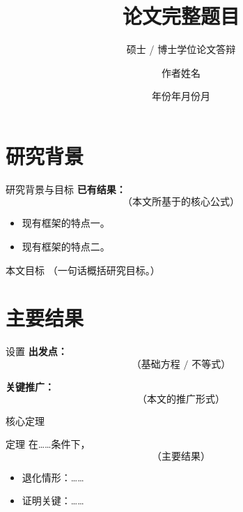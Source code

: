 \documentclass[10pt,aspectratio=169]{ctexbeamer}
\title{论文完整题目}                       %
\subtitle{硕士 / 博士学位论文答辩}        %
\author{作者姓名}                          %
\institute{学院 \\ 北京工业大学 \\ \medskip 导师：\emph{导师姓名}~教授}    %
\date{年份年月份月}                       %
\begin{document}
\begin{frame}[plain]
  \titlepage
\end{frame}

\section{研究背景}

\begin{frame}{研究背景与目标}
  \textbf{已有结果：}
  \begin{equation*}
    \text{（本文所基于的核心公式）}
  \end{equation*}
  \begin{itemize}
    \item 现有框架的特点一。
    \item 现有框架的特点二。
  \end{itemize}

  \pause\medskip
  \begin{block}{本文目标}
    （一句话概括研究目标。）
  \end{block}
\end{frame}

\section{主要结果}

\begin{frame}{设置}
  \textbf{出发点：}
  \begin{equation*}
    \text{（基础方程 / 不等式）}
  \end{equation*}

  \pause
  \textbf{关键推广：}
  \begin{equation*}
    \text{（本文的推广形式）}
  \end{equation*}
\end{frame}

\begin{frame}{核心定理}
  \begin{block}{定理}
    在……条件下，
    \begin{equation*}
      \boxed{\;\text{（主要结果）}\;}
    \end{equation*}
  \end{block}
  \begin{itemize}
    \item 退化情形：……
    \item 证明关键：……
  \end{itemize}
\end{frame}
\end{document}
